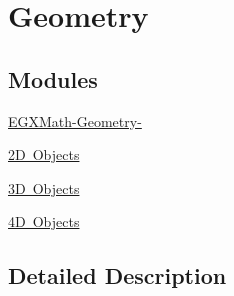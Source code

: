 \hypertarget{group___e_g_x_math-_geometry}{}\section{Geometry}
\label{group___e_g_x_math-_geometry}
\subsection*{Modules}
\begin{DoxyCompactItemize}
\item 
\mbox{\hyperlink{group___e_g_x_math-_geometry-}{E\+G\+X\+Math-\/\+Geometry-\/}}
\item 
\mbox{\hyperlink{group___e_g_x_math-_geometry-2_d}{2\+D Objects}}
\item 
\mbox{\hyperlink{group___e_g_x_math-_geometry-3_d}{3\+D Objects}}
\item 
\mbox{\hyperlink{group___e_g_x_math-_geometry-4_d}{4\+D Objects}}
\end{DoxyCompactItemize}


\subsection{Detailed Description}

